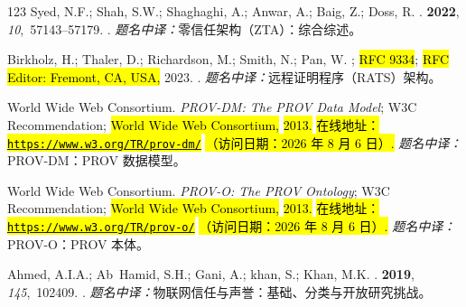 \begin{thebibliography}{123}
Syed, N.F.; Shah, S.W.; Shaghaghi, A.; Anwar, A.; Baig, Z.; Doss, R.
.
 {\bf 2022}, {\em 10},~57143--57179.
.
\newblock \textit{题名中译：}零信任架构（ZTA）：综合综述。

Birkholz, H.; Thaler, D.; Richardson, M.; Smith, N.; Pan, W.
;
\newblock \hl{RFC 9334}; \hl{RFC Editor: Fremont, CA, USA,}   2023.
.
\newblock \textit{题名中译：}远程证明程序（RATS）架构。

{World Wide Web Consortium}.
\newblock \emph{{PROV-DM}: The {PROV} Data Model};
\newblock W3C Recommendation;  \hl{World Wide Web Consortium,} \hl{2013.} \newblock \hl{在线地址：}\space \href{https://www.w3.org/TR/prov-dm/}{\hl{\mbox{\nolinkurl{https://www.w3.org/}}}}\allowbreak\href{https://www.w3.org/TR/prov-dm/}{\hl{\mbox{\nolinkurl{TR/}}}}\allowbreak\href{https://www.w3.org/TR/prov-dm/}{\hl{\mbox{\nolinkurl{prov-dm/}}}} \space\hl{（访问日期：2026 年 8 月 6 日）.}
\newblock \textit{题名中译：}PROV-DM：PROV 数据模型。

{World Wide Web Consortium}.
\newblock \emph{{PROV-O}: The {PROV} Ontology};
\newblock W3C Recommendation;  \hl{World Wide Web Consortium,} \hl{2013.}
\newblock \hl{在线地址：}\space \href{https://www.w3.org/TR/prov-o/}{\hl{\mbox{\nolinkurl{https://www.w3.org/}}}}\allowbreak\href{https://www.w3.org/TR/prov-o/}{\hl{\mbox{\nolinkurl{TR/}}}}\allowbreak\href{https://www.w3.org/TR/prov-o/}{\hl{\mbox{\nolinkurl{prov-o/}}}} \space\hl{（访问日期：2026 年 8 月 6 日）.}
\newblock \textit{题名中译：}PROV-O：PROV 本体。

Ahmed, A.I.A.; Ab~Hamid, S.H.; Gani, A.; khan, S.; Khan, M.K.
.
 {\bf 2019}, {\em
  145},~102409.
.
\newblock \textit{题名中译：}物联网信任与声誉：基础、分类与开放研究挑战。


\end{thebibliography}
